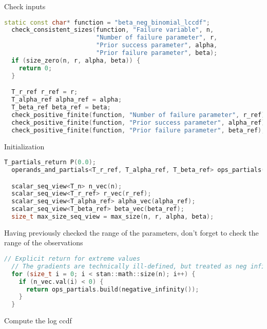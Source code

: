 \documentclass[11pt]{article}
\begin{document}
Check inputs
\begin{lstlisting}[language=c++, style=lgeneral]
  static const char* function = "beta_neg_binomial_lccdf";
  check_consistent_sizes(function, "Failure variable", n,
                         "Number of failure parameter", r,
                         "Prior success parameter", alpha,
                         "Prior failure parameter", beta);
  if (size_zero(n, r, alpha, beta)) {
    return 0;
  }

  T_r_ref r_ref = r;
  T_alpha_ref alpha_ref = alpha;
  T_beta_ref beta_ref = beta;
  check_positive_finite(function, "Number of failure parameter", r_ref);
  check_positive_finite(function, "Prior success parameter", alpha_ref);
  check_positive_finite(function, "Prior failure parameter", beta_ref);
\end{lstlisting}

Initialization
\begin{lstlisting}[language=c++, style=lgeneral]
  T_partials_return P(0.0);
  operands_and_partials<T_r_ref, T_alpha_ref, T_beta_ref> ops_partials(r_ref, alpha_ref, beta_ref);

  scalar_seq_view<T_n> n_vec(n);
  scalar_seq_view<T_r_ref> r_vec(r_ref);
  scalar_seq_view<T_alpha_ref> alpha_vec(alpha_ref);
  scalar_seq_view<T_beta_ref> beta_vec(beta_ref);
  size_t max_size_seq_view = max_size(n, r, alpha, beta);
\end{lstlisting}

Having previously checked the range of the parameters, don’t forget to check the range of the observations
\begin{lstlisting}[language=c++, style=lgeneral]
  // Explicit return for extreme values
  // The gradients are technically ill-defined, but treated as neg infinity
  for (size_t i = 0; i < stan::math::size(n); i++) {
    if (n_vec.val(i) < 0) {
      return ops_partials.build(negative_infinity());
    }
  }
\end{lstlisting}

Compute the log ccdf
\end{document}
